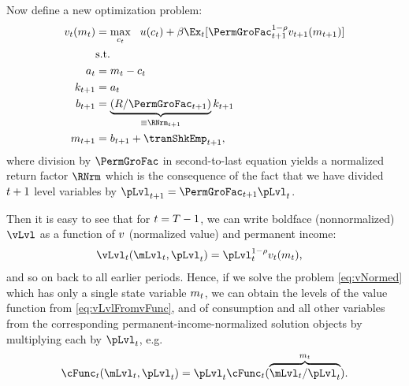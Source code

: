 Now define a new optimization problem:
  \begin{equation}\begin{gathered}\begin{aligned}
        \vFunc_{\prd}(\mNrm_{\prd}) & = \max_{{\cNrm}_{\prd}} ~~ \uFunc(\cNrm_{\prd})+{\DiscFac}\Ex_{\prd}[ \PermGroFac_{\prd+1}^{1-\CRRA}\vFunc_{\prd+1}(\mNrm_{\prd+1})] \label{eq:vNormed}                   \\
                                         & \text{s.t.}                                                                                 \\
        \aNrm_{\prd}                       & = \mNrm_{\prd}-\cNrm_{\prd}                                                                     \\
        \kNrm_{\prd+1}                     & = \aNrm_{\prd}                                                                                \\
        \bNrm_{\prd+1}                     & = \underbrace{\left(\Rfree/\PermGroFac_{\prd+1}\right)}_{\equiv \RNrm_{\prd+1}}\kNrm_{\prd+1} \\
        \mNrm_{t+1}                        & = \bNrm_{t+1}+\tranShkEmp_{t+1},
      \end{aligned}\end{gathered}\end{equation}
where division by $\PermGroFac$ in second-to-last equation yields a normalized return factor $\RNrm$ which is the consequence of the fact that we have divided $t+1$ level variables by $\pLvl_{\prd+1}=\PermGroFac_{\prd+1}\pLvl_{\prd}$.

Then it is easy to see that for $t=T-1$, we can write boldface (nonnormalized) $\vLvl$ as a function of $v$ (normalized value) and permanent income:
\begin{equation}\begin{gathered}\begin{aligned}
      \vLvl_{\prd}(\mLvl_{\prd},\pLvl_{\prd}) & =  \pLvl_{\prd}^{1-\CRRA}\vFunc_{\prdt}(\mNrm_{\prdt}), \label{eq:vLvlFromvFunc}
    \end{aligned}\end{gathered}\end{equation}
and so on back to all earlier periods.  Hence, if we solve the problem \eqref{eq:vNormed} which has only a single state variable $m_{t}$, we can obtain the levels of the value function from \eqref{eq:vLvlFromvFunc}, and of consumption and all other variables from the corresponding permanent-income-normalized solution objects by multiplying each by $\pLvl_{\prd}$, e.g.\
\begin{equation*}\begin{gathered}\begin{aligned}
  \cFunc_{\prd}(\mLvl_{\prd},\pLvl_{\prd})=\pLvl_{\prd}\cFunc_{\prd}(\overbrace{\mLvl_{\prd}/\pLvl_{\prd}}^{\mNrm_{\prd}}).
    \end{aligned}\end{gathered}\end{equation*}

